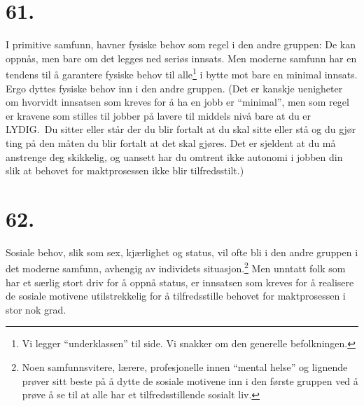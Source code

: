 \documentclass[oneside]{book}
\begin{document}
\section*{61.}
I primitive samfunn, havner fysiske behov som regel i den andre gruppen: De kan
oppnås, men bare om det legges ned seriøs innsats. Men moderne samfunn har en
tendens til å garantere fysiske behov til alle\footnote{Vi legger
``underklassen'' til side. Vi snakker om den generelle befolkningen.} i bytte
mot bare en minimal innsats. Ergo dyttes fysiske behov inn i den andre gruppen.
(Det er kanskje uenigheter om hvorvidt innsatsen som kreves for å ha en jobb er
``minimal'', men som regel er kravene som stilles til jobber på lavere til
middels nivå bare at du er LYDIG.\ Du sitter eller står der du blir fortalt at
du skal sitte eller stå og du gjør ting på den måten du blir fortalt at det
skal gjøres. Det er sjeldent at du må anstrenge deg skikkelig, og uansett har
du omtrent ikke autonomi i jobben din slik at behovet for maktprosessen ikke
blir tilfredsstilt.)

\section*{62.}
Sosiale behov, slik som sex, kjærlighet og status, vil ofte bli i den andre
gruppen i det moderne samfunn, avhengig av individets situasjon.\footnote{Noen
samfunnsvitere, lærere, profesjonelle innen ``mental helse'' og lignende prøver
sitt beste på å dytte de sosiale motivene inn i den første gruppen ved å prøve å
se til at alle har et tilfredsstillende sosialt liv.} Men unntatt
folk som har et særlig stort driv for å oppnå status, er innsatsen som kreves
for å realisere de sosiale motivene utilstrekkelig for å tilfredsstille behovet
for maktprosessen i stor nok grad.
\end{document}
